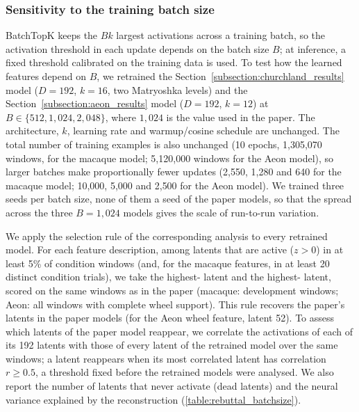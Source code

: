 \subsubsection{Sensitivity to the training batch size}
\label{subsubsection:rebuttal_batchsize}

BatchTopK keeps the $Bk$ largest activations across a training batch, so the activation threshold in each update depends on the batch size $B$; at inference, a fixed threshold calibrated on the training data is used. To test how the learned features depend on $B$, we retrained the Section~\ref{subsection:churchland_results} model ($D=192$, $k=16$, two Matryoshka levels) and the Section~\ref{subsection:aeon_results} model ($D=192$, $k=12$) at $B\in\{512,1{,}024,2{,}048\}$, where $1{,}024$ is the value used in the paper. The architecture, $k$, learning rate and warmup/cosine schedule are unchanged. The total number of training examples is also unchanged (10 epochs, 1{,}305{,}070 windows, for the macaque model; 5{,}120{,}000 windows for the Aeon model), so larger batches make proportionally fewer updates (2{,}550, 1{,}280 and 640 for the macaque model; 10{,}000, 5{,}000 and 2{,}500 for the Aeon model). We trained three seeds per batch size, none of them a seed of the paper models, so that the spread across the three $B=1{,}024$ models gives the scale of run-to-run variation.

We apply the selection rule of the corresponding analysis to every retrained model. For each feature description, among latents that are active ($z>0$) in at least 5\% of condition windows (and, for the macaque features, in at least 20 distinct condition trials), we take the highest- latent and the highest- latent, scored on the same windows as in the paper (macaque: development windows; Aeon: all windows with complete wheel support). This rule recovers the paper's latents in the paper models (for the Aeon wheel feature, latent 52). To assess which latents of the paper model reappear, we correlate the activations of each of its 192 latents with those of every latent of the retrained model over the same windows; a latent reappears when its most correlated latent has correlation $r\geq0.5$, a threshold fixed before the retrained models were analysed. We also report the number of latents that never activate (dead latents) and the neural variance explained by the reconstruction (\autoref{table:rebuttal_batchsize}).

